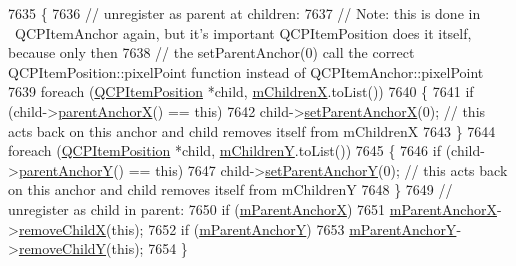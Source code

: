 \begin{DoxyCode}
7635 \{
7636   \textcolor{comment}{// unregister as parent at children:}
7637   \textcolor{comment}{// Note: this is done in ~QCPItemAnchor again, but it's important QCPItemPosition does it itself, because
       only then}
7638   \textcolor{comment}{//       the setParentAnchor(0) call the correct QCPItemPosition::pixelPoint function instead of
       QCPItemAnchor::pixelPoint}
7639   \textcolor{keywordflow}{foreach} (\hyperlink{class_q_c_p_item_position}{QCPItemPosition} *child, \hyperlink{class_q_c_p_item_anchor_a3c0bfd6e50f3b48e2a9b3824695b20f7}{mChildrenX}.toList())
7640   \{
7641     \textcolor{keywordflow}{if} (child->\hyperlink{class_q_c_p_item_position_a485abba71c8552086c5f68e95dca7f9a}{parentAnchorX}() == \textcolor{keyword}{this})
7642       child->\hyperlink{class_q_c_p_item_position_add71461a973927c74e42179480916d9c}{setParentAnchorX}(0); \textcolor{comment}{// this acts back on this anchor and child removes itself
       from mChildrenX}
7643   \}
7644   \textcolor{keywordflow}{foreach} (\hyperlink{class_q_c_p_item_position}{QCPItemPosition} *child, \hyperlink{class_q_c_p_item_anchor_a3abe4eebd0683454d81c8341df6f7115}{mChildrenY}.toList())
7645   \{
7646     \textcolor{keywordflow}{if} (child->\hyperlink{class_q_c_p_item_position_a1502dba801cb20424b7e097399e372de}{parentAnchorY}() == \textcolor{keyword}{this})
7647       child->\hyperlink{class_q_c_p_item_position_add5ec1db9d19cec58a3b5c9e0a0c3f9d}{setParentAnchorY}(0); \textcolor{comment}{// this acts back on this anchor and child removes itself
       from mChildrenY}
7648   \}
7649   \textcolor{comment}{// unregister as child in parent:}
7650   \textcolor{keywordflow}{if} (\hyperlink{class_q_c_p_item_position_a41b4641d18c90997b9c01bf304181bf0}{mParentAnchorX})
7651     \hyperlink{class_q_c_p_item_position_a41b4641d18c90997b9c01bf304181bf0}{mParentAnchorX}->\hyperlink{class_q_c_p_item_anchor_a230b1d494cda63458e289bbe1b642599}{removeChildX}(\textcolor{keyword}{this});
7652   \textcolor{keywordflow}{if} (\hyperlink{class_q_c_p_item_position_afc6142a6a09c8fa41c44d3d54fadd737}{mParentAnchorY})
7653     \hyperlink{class_q_c_p_item_position_afc6142a6a09c8fa41c44d3d54fadd737}{mParentAnchorY}->\hyperlink{class_q_c_p_item_anchor_aa2394911d8fff3bd958b9f4f1994b64d}{removeChildY}(\textcolor{keyword}{this});
7654 \}
\end{DoxyCode}


